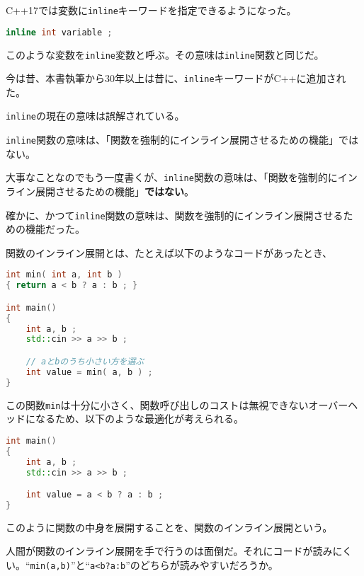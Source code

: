 %

C++17では変数に\lstinline!inline!キーワードを指定できるようになった。

\begin{lstlisting}[language=C++]
inline int variable ;
\end{lstlisting}

このような変数を\lstinline!inline!変数と呼ぶ。その意味は\lstinline!inline!関数と同じだ。

%

今は昔、本書執筆から30年以上は昔に、\lstinline!inline!キーワードがC++に追加された。

\lstinline!inline!の現在の意味は誤解されている。

\lstinline!inline!関数の意味は、「関数を強制的にインライン展開させるための機能」\textsf{ではない}。

大事なことなのでもう一度書くが、\lstinline!inline!関数の意味は、「関数を強制的にインライン展開させるための機能」\textbf{ではない}。

確かに、かつて\lstinline!inline!関数の意味は、関数を強制的にインライン展開させるための機能だった。

関数のインライン展開とは、たとえば以下のようなコードがあったとき、
\begin{lstlisting}[language=C++]
int min( int a, int b )
{ return a < b ? a : b ; }

int main()
{
    int a, b ;
    std::cin >> a >> b ;

    // aとbのうち小さい方を選ぶ
    int value = min( a, b ) ;
}
\end{lstlisting}
この関数\lstinline!min!は十分に小さく、関数呼び出しのコストは無視できないオーバーヘッドになるため、以下のような最適化が考えられる。

\begin{lstlisting}[language=C++]
int main()
{
    int a, b ;
    std::cin >> a >> b ;

    int value = a < b ? a : b ;
}
\end{lstlisting}

このように関数の中身を展開することを、関数のインライン展開という。

人間が関数のインライン展開を手で行うのは面倒だ。それにコードが読みにくい。``\lstinline!min(a,b)!''と``\lstinline!a<b?a:b!''のどちらが読みやすいだろうか。

